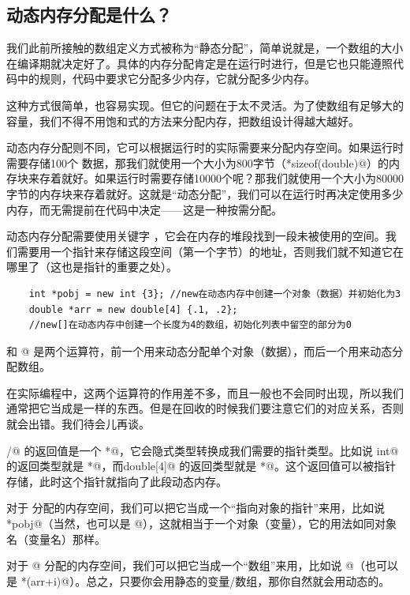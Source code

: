 \subsection*{动态内存分配是什么？}
我们此前所接触的数组定义方式被称为``静态分配''，简单说就是，一个数组的大小在编译期就决定好了。具体的内存分配肯定是在运行时进行，但是它也只能遵照代码中的规则，代码中要求它分配多少内存，它就分配多少内存。\par
这种方式很简单，也容易实现。但它的问题在于太不灵活。为了使数组有足够大的容量，我们不得不用饱和式的方法来分配内存，把数组设计得越大越好。\par
动态内存分配则不同，它可以根据运行时的实际需要来分配内存空间。如果运行时需要存储100个 \lstinline@double@ 数据，那我们就使用一个大小为800字节（*sizeof(double)@）的内存块来存着就好。如果运行时需要存储10000个呢？那我们就使用一个大小为80000字节的内存块来存着就好。这就是``动态分配''，我们可以在运行时再决定使用多少内存，而无需提前在代码中决定——这是一种按需分配。\par
动态内存分配需要使用关键字 \lstinline@new@，它会在内存的堆段找到一段未被使用的空间。我们需要用一个指针来存储这段空间（第一个字节）的地址，否则我们就不知道它在哪里了（这也是指针的重要之处）。
\begin{lstlisting}
    int *pobj = new int {3}; //new在动态内存中创建一个对象（数据）并初始化为3
    double *arr = new double[4] {.1, .2};
    //new[]在动态内存中创建一个长度为4的数组，初始化列表中留空的部分为0
\end{lstlisting}
\lstinline@new@ 和 \lstinline@new[]@ 是两个运算符，前一个用来动态分配单个对象（数据），而后一个用来动态分配数组。\par
在实际编程中，这两个运算符的作用差不多，而且一般也不会同时出现，所以我们通常把它当成是一样的东西。但是在回收的时候我们要注意它们的对应关系，否则就会出错。我们待会儿再谈。\par
\lstinline@new@/\lstinline@new[]@ 的返回值是一个 \lstinline@void*@，它会隐式类型转换成我们需要的指针类型。比如说 \lstinline@new int@ 的返回类型就是 \lstinline@int*@，而\lstinline@new double[4]@ 的返回类型就是 \lstinline@double*@。这个返回值可以被指针存储，此时这个指针就指向了此段动态内存。\par
对于 \lstinline@new@ 分配的内存空间，我们可以把它当成一个``指向对象的指针''来用，比如说 \lstinline@*pobj@（当然，也可以是 \lstinline@pobj[0]@），这就相当于一个对象（变量），它的用法如同对象名（变量名）那样。\par
对于 \lstinline@new[]@ 分配的内存空间，我们可以把它当成一个``数组''来用，比如说 \lstinline@arr[i]@（也可以是 \lstinline@*(arr+i)@）。总之，只要你会用静态的变量/数组，那你自然就会用动态的。\par
